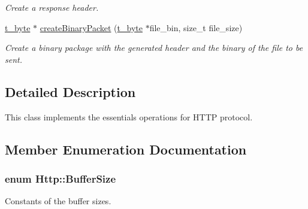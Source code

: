 \begin{DoxyCompactItemize}
\begin{DoxyCompactList}\small\item\em Create a response header. \end{DoxyCompactList}\item 
\hyperlink{util_8h_af1d862c52e0c84cc223f106956ac8543}{t\+\_\+byte} $\ast$ \hyperlink{classHttp_ac577bab53227eeacfb83f12030df069a}{create\+Binary\+Packet} (\hyperlink{util_8h_af1d862c52e0c84cc223f106956ac8543}{t\+\_\+byte} $\ast$file\+\_\+bin, size\+\_\+t file\+\_\+size)
\begin{DoxyCompactList}\small\item\em Create a binary package with the generated header and the binary of the file to be sent. \end{DoxyCompactList}\end{DoxyCompactItemize}


\subsection{Detailed Description}
This class implements the essentials operations for H\+T\+T\+P protocol. 

\subsection{Member Enumeration Documentation}
\hypertarget{classHttp_aa5fa11782ddf38ff8604c6e0f7c7b5d9}{
\subsubsection[{Buffer\+Size}]{\setlength{\rightskip}{0pt plus 5cm}enum {\bf Http\+::\+Buffer\+Size}}}\label{classHttp_aa5fa11782ddf38ff8604c6e0f7c7b5d9}


Constants of the buffer sizes. 

